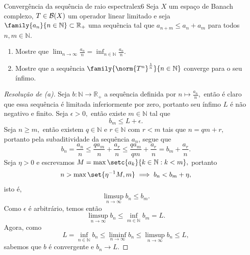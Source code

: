 \begin{exercício}{Convergência da sequência de raio espectral}{ex6}
Seja \(X\) um espaço de Banach complexo, \(T \in \mathcal{B}(X)\) um operador linear limitado e seja \(\family{a_n}{n\in \mathbb{N}} \subset \mathbb{R}_+\) uma sequência tal que \(a_{n+m} \leq a_n + a_m\) para todos \(n,m \in \mathbb{N}.\)
\begin{enumerate}[label=(\alph*)]
  \item Mostre que \(\lim_{n \to \infty}{\frac{a_n}{n}}= \inf_{n\in \mathbb{N}}{\frac{a_n}{n}}.\)
  \item Mostre que a sequência \(\family{\norm{T^n}^{\frac1n}}{n\in\mathbb{N}}\) converge para o seu ínfimo.
\end{enumerate}
\end{exercício}
\begin{proof}[Resolução de (a)]
  Seja \(b : \mathbb{N} \to \mathbb{R}_+\) a sequência definida por \(n \mapsto \frac{a_n}{n},\) então é claro que essa sequência é limitada inferiormente por zero, portanto seu ínfimo \(L\) é não negativo e finito. Seja \(\epsilon > 0,\) então existe \(m \in \mathbb{N}\) tal que
  \begin{equation*}
      b_m \leq L + \epsilon.
  \end{equation*}
  Seja \(n \geq m,\) então existem \(q \in \mathbb{N}\) e \(r \in \mathbb{N}\) com \(r < m\) tais que \(n = qm + r,\) portanto pela subaditividade da sequência \(a_n\), segue que
  \begin{equation*}
    b_n = \frac{a_n}{n} \leq \frac{q a_m}{n} + \frac{a_r}{n} \leq \frac{q a_m}{qm} + \frac{a_r}{n} = b_m + \frac{a_r}{n}.
  \end{equation*}
  Seja \(\eta > 0\) e escrevamos \(M = \max\setc{a_k}{k \in \mathbb{N} : k < m},\) portanto
  \begin{equation*}
    n > \max\set{\eta^{-1} M, m} \implies b_n < b_m + \eta,
  \end{equation*}
  isto é,
  \begin{equation*}
    \limsup_{n\to\infty}{b_n} \leq b_m.
  \end{equation*}
  Como \(\epsilon\) é arbitrário, temos então
  \begin{equation*}
    \limsup_{n\to\infty}{b_n} \leq \inf_{m \in \mathbb{N}}{b_m} = L.
  \end{equation*}
  Agora, como
  \begin{equation*}
    L = \inf_{n \in \mathbb{N}}{b_n} \leq \liminf_{n\to\infty}{b_n} \leq \limsup_{n\to\infty}{b_n} \leq L,
  \end{equation*}
  sabemos que \(b\) é convergente e \(b_n \to L\).
\end{proof}

